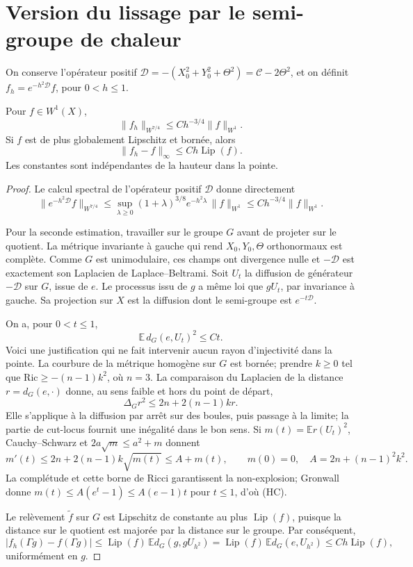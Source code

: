 \section{Version du lissage par le semi-groupe de chaleur}

On conserve l'opérateur positif
$\mathcal D=-(X_0^2+Y_0^2+\Theta^2)=\mathcal C-2\Theta^2$,
et on définit $f_h=e^{-h^2\mathcal D}f$, pour $0<h\le1$.

\begin{lemma}
Pour $f\in W^1(X)$,
\[
 \|f_h\|_{W^{7/4}}\le Ch^{-3/4}\|f\|_{W^1}.
\]
Si $f$ est de plus globalement Lipschitz et bornée, alors
\[
 \|f_h-f\|_\infty\le Ch\operatorname{Lip}(f).
\]
Les constantes sont indépendantes de la hauteur dans la pointe.
\end{lemma}

\begin{proof}
Le calcul spectral de l'opérateur positif $\mathcal D$ donne directement
\[
 \|e^{-h^2\mathcal D}f\|_{W^{7/4}}
 \le\sup_{\lambda\ge0}
       (1+\lambda)^{3/8}e^{-h^2\lambda}\,\|f\|_{W^1}
 \le Ch^{-3/4}\|f\|_{W^1}.
\]

Pour la seconde estimation, travailler sur le groupe $G$ avant de
projeter sur le quotient. La métrique invariante à gauche qui rend
$X_0,Y_0,\Theta$ orthonormaux est complète. Comme $G$ est unimodulaire,
ces champs ont divergence nulle et $-\mathcal D$ est exactement son
Laplacien de Laplace--Beltrami. Soit $U_t$ la diffusion de générateur
$-\mathcal D$ sur $G$, issue de $e$. Le processus issu de $g$ a même loi
que $gU_t$, par invariance à gauche. Sa projection sur $X$ est la diffusion
dont le semi-groupe est $e^{-t\mathcal D}$.

On a, pour $0<t\le1$,
\[
 \mathbb E\,d_G(e,U_t)^2\le Ct.
 \tag{HC}
\]
Voici une justification qui ne fait intervenir aucun rayon d'injectivité
dans la pointe. La courbure de la métrique homogène sur $G$ est bornée;
prendre $k\ge0$ tel que $\mathrm{Ric}\ge-(n-1)k^2$, où $n=3$.
La comparaison du Laplacien de la distance $r=d_G(e,\cdot)$ donne,
au sens faible et hors du point de départ,
\[
 \Delta_G r^2\le2n+2(n-1)kr.
\]
Elle s'applique à la diffusion par arrêt sur des boules, puis passage
à la limite; la partie de cut-locus fournit une inégalité dans le bon
sens. Si $m(t)=\mathbb E r(U_t)^2$, Cauchy--Schwarz et
$2a\sqrt m\le a^2+m$ donnent
\[
 m'(t)\le2n+2(n-1)k\sqrt{m(t)}
       \le A+m(t),\qquad m(0)=0,
 \quad A=2n+(n-1)^2k^2.
\]
La complétude et cette borne de Ricci garantissent la non-explosion;
Gronwall donne $m(t)\le A(e^t-1)\le A(e-1)t$ pour $t\le1$, d'où (HC).

Le relèvement $\widetilde f$ sur $G$ est Lipschitz de constante au plus
$\operatorname{Lip}(f)$, puisque la distance sur le quotient est majorée
par la distance sur le groupe. Par conséquent,
\[
 |f_h(\Gamma g)-f(\Gamma g)|
 \le\operatorname{Lip}(f)\,
      \mathbb E d_G(g,gU_{h^2})
 =\operatorname{Lip}(f)\,
      \mathbb E d_G(e,U_{h^2})
 \le Ch\operatorname{Lip}(f),
\]
uniformément en $g$.
\end{proof}

